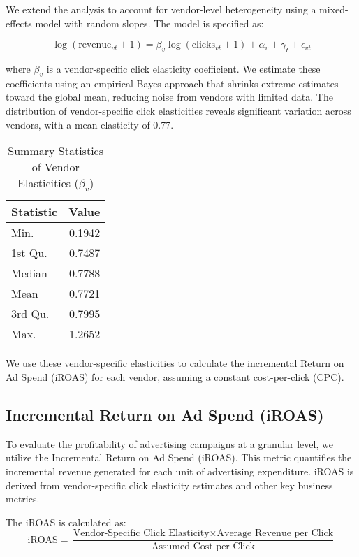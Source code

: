 We extend the analysis to account for vendor-level heterogeneity using a mixed-effects model with random slopes. The model is specified as:

\begin{equation}
\log(\text{revenue}_{vt} + 1) = \beta_v \log(\text{clicks}_{vt} + 1) + \alpha_v + \gamma_t + \epsilon_{vt}
\end{equation}

where $\beta_v$ is a vendor-specific click elasticity coefficient. We estimate these coefficients using an empirical Bayes approach that shrinks extreme estimates toward the global mean, reducing noise from vendors with limited data. The distribution of vendor-specific click elasticities reveals significant variation across vendors, with a mean elasticity of 0.77.

\begin{table}[htbp!]
\centering
\caption{Summary Statistics of Vendor Elasticities ($\beta_v$)}
\label{tab:vendor_beta_v_dist}
\begin{tabular}{lr}
\toprule
Statistic & Value \\
\midrule
Min. & 0.1942 \\
1st Qu. & 0.7487 \\
Median & 0.7788 \\
Mean & 0.7721 \\
3rd Qu. & 0.7995 \\
Max. & 1.2652 \\
\bottomrule
\end{tabular}
\end{table}

We use these vendor-specific elasticities to calculate the incremental Return on Ad Spend (iROAS) for each vendor, assuming a constant cost-per-click (CPC).

\subsection*{Incremental Return on Ad Spend (iROAS)}

To evaluate the profitability of advertising campaigns at a granular level, we utilize the Incremental Return on Ad Spend (iROAS). This metric quantifies the incremental revenue generated for each unit of advertising expenditure. iROAS is derived from vendor-specific click elasticity estimates and other key business metrics.

The iROAS is calculated as:
\begin{equation}
\text{iROAS} = \frac{\text{Vendor-Specific Click Elasticity} \times \text{Average Revenue per Click}}{\text{Assumed Cost per Click}}
\end{equation}

